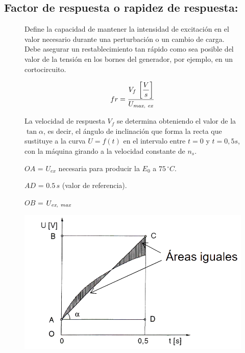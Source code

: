 		\subsection{Factor de respuesta o rapidez de respuesta:}
			\begin{figure}[H]
				\begin{minipage}{0.75\textwidth}
					Define la capacidad de mantener la intensidad de excitación en el valor necesario durante una perturbación o un cambio de carga. Debe asegurar un restablecimiento tan rápido como sea posible del valor de la tensión en los
					bornes del generador, por ejemplo, en un cortocircuito. 
				\end{minipage}
				\begin{minipage}{0.24\textwidth}
					\[fr = \dfrac{V_f\,\left[\dfrac{V}{s}\right]}{U_{\text{\textit{max, ex}}}}\]
				\end{minipage}
			\end{figure}			

			\begin{figure}[H]
				\begin{minipage}{0.6\textwidth}
					La velocidad de respuesta $V_f$ se determina obteniendo el valor de la $\tan \alpha$, es decir, el ángulo de inclinación que forma la recta que sustituye a la curva $U = f(t)$ en el intervalo entre $t=0$ y $t = 0,5 s$, con la máquina girando a la velocidad constante de $n_s$.
					
					\vspace{0.25cm}
					$OA$ = $U_{ex}$ necesaria para producir la $E_0$ a $75\,^\circ C$.
					
					$AD$ = $0.5\,s$ (valor de referencia).
					
					$OB$ = $U_{\text{\textit{ex, max}}}$
				\end{minipage}
				\begin{minipage}{0.4\textwidth}
					\includegraphics[width=1\linewidth]{res/tema7/tanAlpha}
				\end{minipage}
			\end{figure}
					
